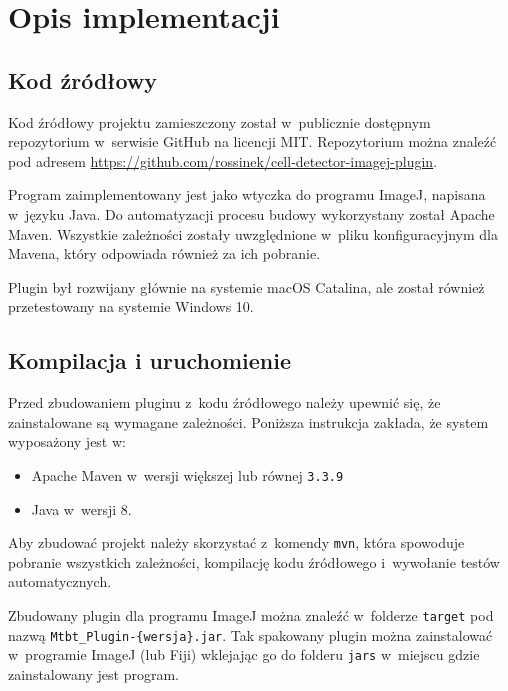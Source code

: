 \documentclass[declaration,shortabstract,mgr]{iithesis}
\begin{document}

\chapter{Opis implementacji}



\section{Kod źródłowy}

Kod źródłowy projektu zamieszczony został w~publicznie dostępnym repozytorium w~serwisie GitHub na licencji MIT.
Repozytorium można znaleźć pod adresem
\linebreak\url{https://github.com/rossinek/cell-detector-imagej-plugin}.

Program zaimplementowany jest jako wtyczka do programu ImageJ, napisana w~języku Java. Do automatyzacji procesu budowy wykorzystany został Apache Maven. Wszystkie zależności zostały uwzględnione w~pliku konfiguracyjnym dla Mavena, który odpowiada również za ich pobranie.

Plugin był rozwijany głównie na systemie macOS Catalina, ale został również przetestowany na systemie Windows 10.

\section{Kompilacja i uruchomienie}

Przed zbudowaniem pluginu z~kodu źródłowego należy upewnić się, że zainstalowane są wymagane zależności. Poniższa instrukcja zakłada, że system wyposażony jest w:

\begin{itemize}
  \item Apache Maven w~wersji większej lub równej \texttt{3.3.9}
  \item Java w~wersji 8.
\end{itemize}

Aby zbudować projekt należy skorzystać z~komendy \texttt{mvn}, która spowoduje pobranie wszystkich zależności,  kompilację kodu źródłowego i~wywołanie testów automatycznych.

Zbudowany plugin dla programu ImageJ można znaleźć w~folderze \texttt{target} pod nazwą \texttt{Mtbt\_Plugin-\{wersja\}.jar}. Tak spakowany plugin można zainstalować w~programie ImageJ (lub Fiji) wklejając go do folderu \texttt{jars} w~miejscu gdzie zainstalowany jest program.
\end{document}
